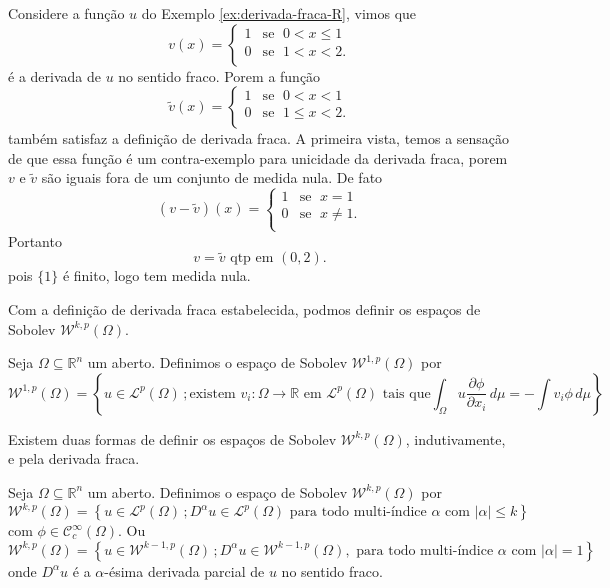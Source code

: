 \documentclass[a4paper, 11pt]{book}
\theoremstyle{definition}
\newcommand{\bR}{\mathbb{R}}
\newcommand{\cC}{\mathcal{C}}
\newcommand{\cL}{\mathcal{L}}
\newcommand{\cW}{\mathcal{W}}
\begin{document}
\begin{ex}
    Considere a função $u$ do Exemplo \ref{ex:derivada-fraca-R}, vimos que
    \[
        v(x) = \left\{
            \begin{array}{rl}
                1 & \text{se }\; 0 < x \leqslant 1\\
                0 & \text{se }\; 1 < x < 2.\\
            \end{array}
        \right.
    \]
    é a derivada de $u$ no sentido fraco.
    Porem a função
    \[
        \tilde v(x) = \left\{
            \begin{array}{rl}
                1 & \text{se }\; 0 < x < 1\\
                0 & \text{se }\; 1 \leqslant x < 2.\\
            \end{array}
        \right.
    \]
    também satisfaz a definição de derivada fraca.
    A primeira vista, temos a sensação de que essa função é um contra-exemplo para unicidade da derivada fraca, porem $v$ e $\tilde v$ são iguais fora de um conjunto de medida nula.
    De fato
    \[
        (v - \tilde v)(x) = \left\{
            \begin{array}{rl}
                1 & \text{se }\; x = 1\\
                0 & \text{se }\; x \neq 1.\\
            \end{array}
        \right.
    \]
    Portanto
    \[
        v = \tilde v \text{ qtp em } (0,2).
    \]
    pois $\{1\}$ é finito, logo tem medida nula.
\end{ex}

Com a definição de derivada fraca estabelecida, podmos definir os espaços de Sobolev $\cW^{k,p}(\Omega)$.

\begin{dbox}
    Seja $\Omega \subseteq \bR^n$ um aberto. 
    Definimos o espaço de Sobolev $\cW^{1,p}(\Omega)$ por
    \[
        \cW^{1,p}(\Omega) = \left\{u \in \cL^p(\Omega) \,; \text{existem } v_i : \Omega \to \bR \text{ em $\cL^p(\Omega)$ tais que} \int_\Omega u \dfrac{\partial \phi}{\partial x_i} \, d\mu = -\!\!\int v_i \phi \,d\mu \right\}
    \]
\end{dbox}

Existem duas formas de definir os espaços de Sobolev $\cW^{k,p}(\Omega)$, indutivamente, e pela derivada fraca.

\begin{dbox}
    Seja $\Omega \subseteq \bR ^n$ um aberto. Definimos o espaço de Sobolev $\cW^{k,p}(\Omega)$ por
    \[
        \cW^{k,p}(\Omega) = \left\{ u \in \cL^p(\Omega) \,; D^\alpha u \in \cL^p(\Omega) \text{ para todo multi-índice } \alpha \text{ com } |\alpha| \leqslant k\right\}
    \]
    com $\phi \in \cC^\infty_c(\Omega)$. 
    Ou
    \[
        \cW^{k,p}(\Omega) = \left\{ u \in \cW^{k-1,p}(\Omega) \,; D^\alpha u \in \cW^{k-1,p}(\Omega) , \text{ para todo multi-índice } \alpha \text{ com } |\alpha| = 1\right\}
    \]
    onde $D^\alpha u$ é a $\alpha$-ésima derivada parcial de $u$ no sentido fraco.
\end{dbox}
\end{document}
